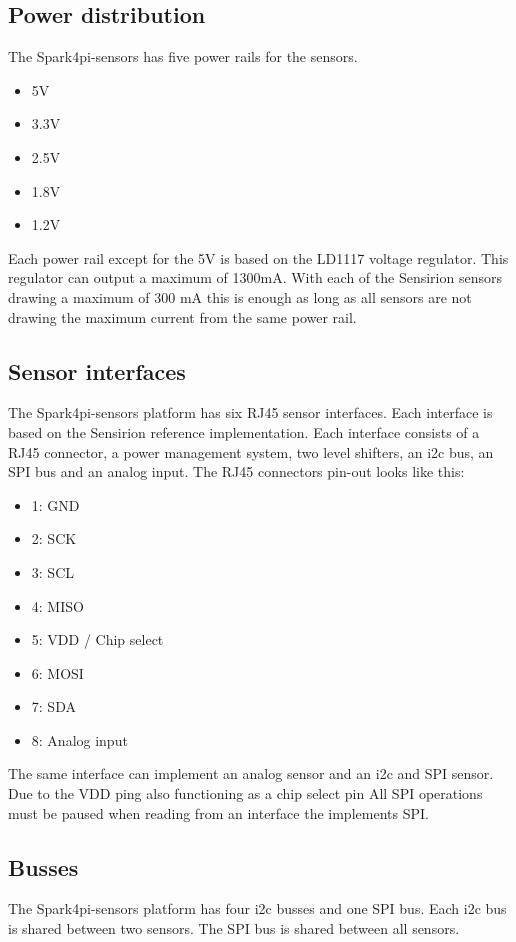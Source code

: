 \documentclass[12pt]{article}
\begin{document}
\subsection{Power distribution}
The Spark4pi-sensors has five power rails for the sensors.
\begin{itemize}
    \item 5V
    \item 3.3V
    \item 2.5V
    \item 1.8V
    \item 1.2V
\end{itemize}
Each power rail except for the 5V is based on the LD1117 voltage regulator. This regulator can output a maximum of 1300mA. With each of 
the Sensirion sensors drawing a maximum of 300 mA this is enough as long as all sensors are not drawing the maximum current from the same power rail.

\subsection{Sensor interfaces}
The Spark4pi-sensors platform has six RJ45 sensor interfaces. Each interface is based on the Sensirion reference implementation.
Each interface consists of a RJ45 connector, a power management system, two level shifters, an i2c bus, an SPI bus and an analog input.
The RJ45 connectors pin-out looks like this:
\begin{itemize}
    \item 1: GND
    \item 2: SCK
    \item 3: SCL
    \item 4: MISO
    \item 5: VDD / Chip select
    \item 6: MOSI
    \item 7: SDA
    \item 8: Analog input
\end{itemize}
The same interface can implement an analog sensor and an i2c and SPI sensor. Due to the VDD ping also functioning as a chip select pin
All SPI operations must be paused when reading from an interface the implements SPI.
\subsection{Busses}
The Spark4pi-sensors platform has four i2c busses and one SPI bus. Each i2c bus is shared between two sensors. The SPI bus is shared between all sensors.
\end{document}
